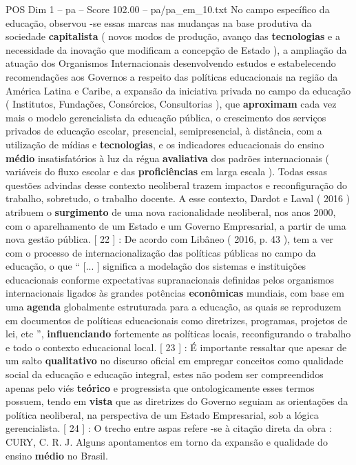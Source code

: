 \begin{textsample}{POS Dim 1 – pa – Score 102.00 – pa/pa\_em\_10.txt}
No campo específico da educação, observou -se essas marcas nas mudanças na base produtiva da sociedade \textbf{capitalista} ( novos modos de produção, avanço das \textbf{tecnologias} e a necessidade da inovação que modificam a concepção de Estado ), a ampliação da atuação dos Organismos Internacionais desenvolvendo estudos e estabelecendo recomendações aos Governos a respeito das políticas educacionais na região da América Latina e Caribe, a expansão da iniciativa privada no campo da educação ( Institutos, Fundações, Consórcios, Consultorias ), que \textbf{aproximam} cada vez mais o modelo gerencialista da educação pública, o crescimento dos serviços privados de educação escolar, presencial, semipresencial, à distância, com a utilização de mídias e \textbf{tecnologias}, e os indicadores educacionais do ensino \textbf{médio} insatisfatórios à luz da régua \textbf{avaliativa} dos padrões internacionais ( variáveis do fluxo escolar e das \textbf{proficiências} em larga escala ).
Todas essas questões advindas desse contexto neoliberal trazem impactos e reconfiguração do trabalho, sobretudo, o trabalho docente.
A esse contexto, Dardot e Laval ( 2016 ) atribuem o \textbf{surgimento} de uma nova racionalidade neoliberal, nos anos 2000, com o aparelhamento de um Estado e um Governo Empresarial, a partir de uma nova gestão pública. [ 22 ] : De acordo com Libâneo ( 2016, p. 43 ), tem a ver com o processo de internacionalização das políticas públicas no campo da educação, o que “ [... ] significa a modelação dos sistemas e instituições educacionais conforme expectativas supranacionais definidas pelos organismos internacionais ligados às grandes potências \textbf{econômicas} mundiais, com base em uma \textbf{agenda} globalmente estruturada para a educação, as quais se reproduzem em documentos de políticas educacionais como diretrizes, programas, projetos de lei, etc ”, \textbf{influenciando} fortemente as políticas locais, reconfigurando o trabalho e todo o contexto educacional local. [ 23 ] : É importante ressaltar que apesar de um salto \textbf{qualitativo} no discurso oficial em empregar conceitos como qualidade social da educação e educação integral, estes não podem ser compreendidos apenas pelo viés \textbf{teórico} e progressista que ontologicamente esses termos possuem, tendo em \textbf{vista} que as diretrizes do Governo seguiam as orientações da política neoliberal, na perspectiva de um Estado Empresarial, sob a lógica gerencialista. [ 24 ] : O trecho entre aspas refere -se à citação direta da obra : CURY, C.
R.
J.
Alguns apontamentos em torno da expansão e qualidade do ensino \textbf{médio} no Brasil.

\end{textsample}
